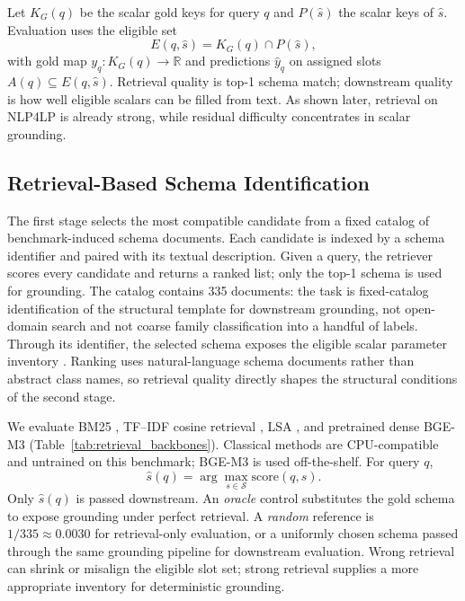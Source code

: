 \documentclass[pdflatex,sn-basic,Numbered]{sn-jnl}
\begin{document}
Let $K_G(q)$ be the scalar gold keys for query $q$ and $P(\hat{s})$ the scalar keys of $\hat{s}$. Evaluation uses the eligible set
\begin{equation}
E(q,\hat{s}) = K_G(q) \cap P(\hat{s}),
\label{eq:eligible_slots}
\end{equation}
with gold map $y_q : K_G(q) \to \mathbb{R}$ and predictions $\hat{y}_{q}$ on assigned slots $A(q) \subseteq E(q,\hat{s})$. Retrieval quality is top-1 schema match; downstream quality is how well eligible scalars can be filled from text. As shown later, retrieval on \textsc{NLP4LP} is already strong, while residual difficulty concentrates in scalar grounding.

\subsection{Retrieval-Based Schema Identification}
\label{subsec:method_retrieval}

The first stage selects the most compatible candidate from a fixed catalog of benchmark-induced schema documents. Each candidate is indexed by a schema identifier and paired with its textual description. Given a query, the retriever scores every candidate and returns a ranked list; only the top-1 schema is used for grounding. The catalog contains 335 documents: the task is fixed-catalog identification of the structural template for downstream grounding, not open-domain search and not coarse family classification into a handful of labels. Through its identifier, the selected schema exposes the eligible scalar parameter inventory \cite{nlp4lp_dataset,ramamonjison2023nl4opt,ahmaditeshnizi2024optimus_icml}. Ranking uses natural-language schema documents rather than abstract class names, so retrieval quality directly shapes the structural conditions of the second stage.

We evaluate BM25 \cite{robertson2009bm25}, TF--IDF cosine retrieval \cite{pedregosa2011sklearn}, LSA \cite{deerwester1990lsa}, and pretrained dense BGE-M3 \cite{chen2024m3embedding} (Table~\ref{tab:retrieval_backbones}). Classical methods are CPU-compatible and untrained on this benchmark; BGE-M3 is used off-the-shelf. For query $q$,
\begin{equation}
\hat{s}(q) = \arg\max_{s \in \mathcal{S}} \mathrm{score}(q,s).
\label{eq:schema_retrieval}
\end{equation}
Only $\hat{s}(q)$ is passed downstream. An \emph{oracle} control substitutes the gold schema to expose grounding under perfect retrieval. A \emph{random} reference is $1/335 \approx 0.0030$ for retrieval-only evaluation, or a uniformly chosen schema passed through the same grounding pipeline for downstream evaluation. Wrong retrieval can shrink or misalign the eligible slot set; strong retrieval supplies a more appropriate inventory for deterministic grounding.
\end{document}
